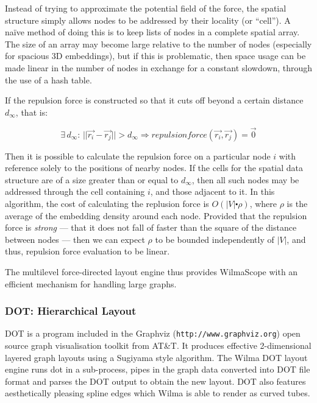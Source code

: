 \documentclass[runningheads]{cl2emult}
\newcommand{\url}[1]{{\small{\tt #1}}}
\begin{document}
Instead of trying to approximate the potential field of the force, the
spatial structure simply allows nodes to be addressed by their locality (or
``cell'').  A na\"{i}ve method of doing this is to keep lists of nodes in a
complete spatial array.  The size of an array may become large relative to
the number of nodes (especially for spacious 3D embeddings), but if this is
problematic, then space usage can be made linear in the number of nodes in
exchange for a constant slowdown, through the use of a hash table.

If the repulsion force is constructed so that it cuts off beyond a certain
distance $d_\infty$, that is:

\begin{equation}
\exists \, d_\infty : \, 
||\vec{r_i} - \vec{r_j}|| > d_\infty
\Rightarrow 
repulsionforce (\vec{r_i},\vec{r_j}) = \vec{0}
\end{equation}

Then it is possible to calculate the repulsion force on a particular node $i$
with reference solely to the positions of nearby nodes.  If the cells for
the spatial data structure are of a size greater than or equal to $d_\infty$,
then all such nodes may be addressed through the cell containing $i$, and
those adjacent to it.  In this algorithm, the cost of calculating the
replusion force is $O(|V| \centerdot \rho)$, where $\rho$ is the average 
of the embedding density around each node.  Provided that the repulsion
force is {\em strong} --- that it does not fall of faster than the square
of the distance between nodes --- then we can expect $\rho$ to be bounded
independently of $|V|$, and thus, repulsion force evaluation to be linear.

The multilevel force-directed layout engine thus provides WilmaScope with
an efficient mechanism for handling large graphs.

\subsubsection{DOT: Hierarchical Layout}
DOT is a program included in the Graphviz
(\url{http://www.graphviz.org}) open source graph visualisation
toolkit from AT\&T.  It produces effective 2-dimensional layered graph
layouts using a Sugiyama\cite{Sugiyama81methods} style algorithm.
The Wilma DOT layout engine runs dot in a sub-process, pipes in the graph
data converted into DOT file format and parses the DOT output to
obtain the new layout.
DOT also features aesthetically pleasing spline edges which Wilma
is able to render as curved tubes.
\end{document}
